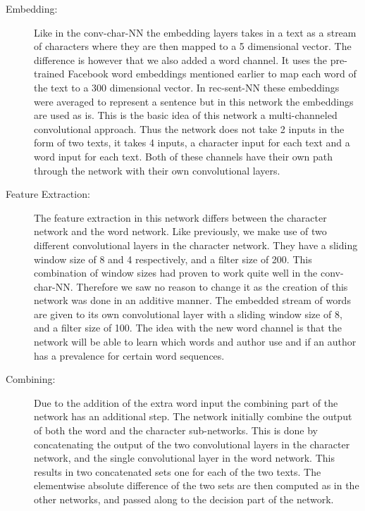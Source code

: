 \begin{description}

    \item[Embedding:]

        Like in the \gls{conv-char-NN} the embedding layers takes in a text as
        a stream of characters where they are then mapped to a 5 dimensional
        vector. The difference is however that we also added a word channel. It
        uses the pre-trained Facebook word embeddings mentioned earlier to map
        each word of the text to a 300 dimensional vector. In \gls{rec-sent-NN}
        these embeddings were averaged to represent a sentence but in this
        network the embeddings are used as is. This is the basic idea of this
        network a multi-channeled convolutional approach. Thus the network
        does not take 2 inputs in the form of two texts, it takes 4 inputs, a
        character input for each text and a word input for each text. Both of
        these channels have their own path through the network with their own
        convolutional layers.

    \item[Feature Extraction:]

        The feature extraction in this network differs between the character
        network and the word network. Like previously, we make use of two
        different convolutional layers in the character network. They have a
        sliding window size of 8 and 4 respectively, and a filter size of 200.
        This combination of window sizes had proven to work quite well in the
        \gls{conv-char-NN}. Therefore we saw no reason to change it as the
        creation of this network was done in an additive manner. The embedded
        stream of words are given to its own convolutional layer with a sliding
        window size of 8, and a filter size of 100. The idea with the new word
        channel is that the network will be able to learn which words and author
        use and if an author has a prevalence for certain word sequences.

    \item[Combining:]

        Due to the addition of the extra word input the combining part of
        the network has an additional step. The network initially combine
        the output of both the word and the character sub-networks. This is
        done by concatenating the output of the two convolutional layers in
        the character network, and the single convolutional layer in the word
        network. This results in two concatenated sets one for each of the two
        texts. The elementwise absolute difference of the two sets are then
        computed as in the other networks, and passed along to the decision part
        of the network.


\end{description}
